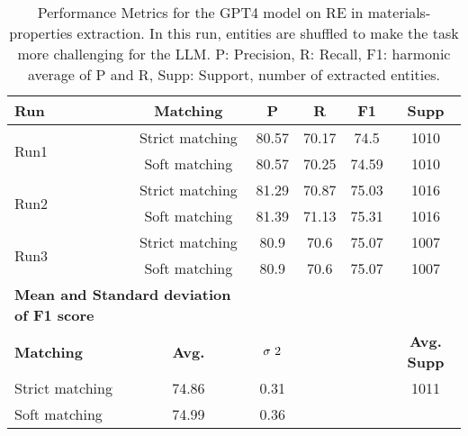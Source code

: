 \begin{table}[htbp]
    \small
    \centering
    \caption{Performance Metrics for the GPT4 model on RE in materials-properties extraction. In this run, entities are shuffled to make the task more challenging for the LLM. P: Precision, R: Recall, F1: harmonic average of P and R, Supp: Support, number of extracted entities.}
    \begin{tabular}{lccccc}
        \toprule
        \textbf{Run} & \textbf{Matching} & \textbf{P} & \textbf{R} & \textbf{F1} & \textbf{Supp} \\
        \midrule
        \multirow{2}{*}{Run1} & Strict matching & 80.57 & 70.17 & 74.5 & 1010 \\
        & Soft matching & 80.57 & 70.25 & 74.59 & 1010 \\
        \midrule
        \multirow{2}{*}{Run2} & Strict matching & 81.29 & 70.87 & 75.03 & 1016 \\
        & Soft matching & 81.39 & 71.13 & 75.31 & 1016 \\
        \midrule
        \multirow{2}{*}{Run3} & Strict matching & 80.9 & 70.6 & 75.07 & 1007 \\
        & Soft matching & 80.9 & 70.6 & 75.07 & 1007 \\
        \midrule
        \multicolumn{2}{l}{\textbf{Mean and Standard deviation of F1 score}} & & & & \\
        \midrule
        \textbf{Matching} & \textbf{Avg.} & $\sigma\textsuperscript{2}$ & & & \textbf{Avg. Supp}\\
        Strict matching & 74.86 & 0.31 & & & 1011 \\
        Soft matching & 74.99 & 0.36 & & \\
        \bottomrule
    \end{tabular}
\end{table}


